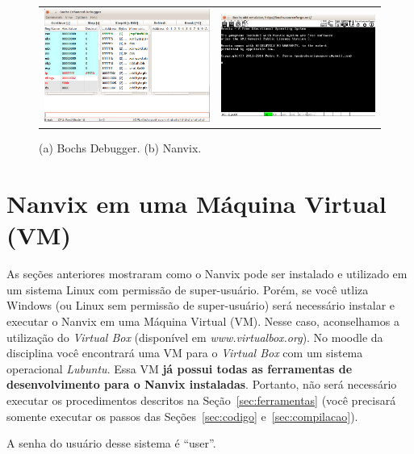 \documentclass[11pt]{article}
\begin{document}
\begin{figure}[t]
	\centering
	\begin{tabular}{cc}
		\includegraphics[scale=0.3]{img/bochs.png} & 	\includegraphics[scale=0.33]{img/nanvix.png} \\
	\end{tabular}
	\caption{(a) Bochs Debugger. (b) Nanvix.}
	\label{fig:bochs}
\end{figure}

\section{Nanvix em uma Máquina Virtual (VM)}
\label{sec:vm}

As seções anteriores mostraram como o Nanvix pode ser instalado e utilizado em um sistema Linux com permissão de super-usuário. Porém, se você utliza Windows (ou Linux sem permissão de super-usuário) será necessário instalar e executar o Nanvix em uma Máquina Virtual (VM). Nesse caso, aconselhamos a utilização do \textit{Virtual Box} (disponível em \textit{www.virtualbox.org}). No moodle da disciplina você encontrará uma VM para o \textit{Virtual Box} com um sistema operacional \textit{Lubuntu}. Essa VM \textbf{já possui todas as ferramentas de desenvolvimento para o Nanvix instaladas}. Portanto, não será necessário executar os procedimentos descritos na Seção~\ref{sec:ferramentas} (você precisará somente executar os passos das Seções~\ref{sec:codigo} e~\ref{sec:compilacao}).

A senha do usuário desse sistema é ``user''.
\end{document}
